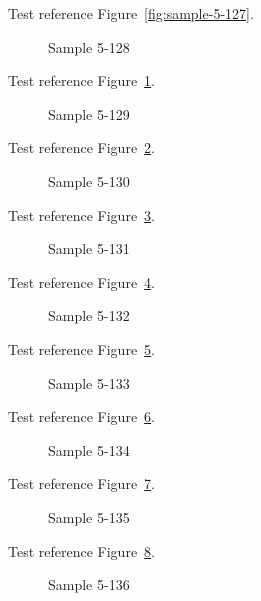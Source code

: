 Test reference Figure~\ref{fig:sample-5-127}.

\begin{figure}[tbhp]
\caption{Sample 5-128}
\label{fig:sample-5-128}
\end{figure}

Test reference Figure~\ref{fig:sample-5-128}.

\begin{figure}[tbhp]
\caption{Sample 5-129}
\label{fig:sample-5-129}
\end{figure}

Test reference Figure~\ref{fig:sample-5-129}.

\begin{figure}[tbhp]
\caption{Sample 5-130}
\label{fig:sample-5-130}
\end{figure}

Test reference Figure~\ref{fig:sample-5-130}.

\begin{figure}[tbhp]
\caption{Sample 5-131}
\label{fig:sample-5-131}
\end{figure}

Test reference Figure~\ref{fig:sample-5-131}.

\begin{figure}[tbhp]
\caption{Sample 5-132}
\label{fig:sample-5-132}
\end{figure}

Test reference Figure~\ref{fig:sample-5-132}.

\begin{figure}[tbhp]
\caption{Sample 5-133}
\label{fig:sample-5-133}
\end{figure}

Test reference Figure~\ref{fig:sample-5-133}.

\begin{figure}[tbhp]
\caption{Sample 5-134}
\label{fig:sample-5-134}
\end{figure}

Test reference Figure~\ref{fig:sample-5-134}.

\begin{figure}[tbhp]
\caption{Sample 5-135}
\label{fig:sample-5-135}
\end{figure}

Test reference Figure~\ref{fig:sample-5-135}.

\begin{figure}[tbhp]
\caption{Sample 5-136}
\label{fig:sample-5-136}
\end{figure}

